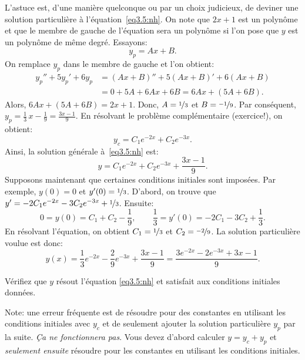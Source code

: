L'astuce est, d'une manière quelconque ou par un choix judicieux, de deviner une solution particulière à 
l'équation~\eqref{eq3.5:nh}.  
On note que $2x+1$ est un polynôme et que le membre de gauche de l'équation sera un polynôme si l'on pose que $y$ est un polynôme de même degré. Essayons: 
\begin{equation*}
	y_p = Ax + B .
\end{equation*}
On remplace $y_p$ dans le membre de gauche et l'on obtient: 
\begin{align*}
	y_p'' + 5y_p'+ 6y_p & = (Ax+B)'' + 5(Ax+B)' + 6(Ax+B) \\
						& = 0 + 5A + 6Ax + 6B = 6Ax+ (5A+6B) .
\end{align*}
Alors, $6Ax+(5A+6B) = 2x+1$.  
Donc, $A = \nicefrac{1}{3}$ et $B = \nicefrac{-1}{9}$.
Par conséquent, $y_p = \frac{1}{3}\, x - \frac{1}{9} = \frac{3x-1}{9}$.
En résolvant le problème complémentaire (exercice!), on obtient: 
\begin{equation*}
	y_c = C_1 e^{-2x} + C_2 e^{-3x}.
\end{equation*}
Ainsi, la solution générale à~\eqref{eq3.5:nh} est: 
\begin{equation*}
	y = C_1 e^{-2x} + C_2 e^{-3x} + \frac{3x-1}{9} .
\end{equation*}
Supposons maintenant que certaines conditions initiales sont imposées. 
Par exemple,  $y(0) = 0$ et $y'(0) = \nicefrac{1}{3}$.  
D'abord, on trouve que $y' = - 2C_1 e^{-2x} - 3C_2 e^{-3x} + \nicefrac{1}{3}$.
Ensuite: 
\begin{equation*}
			0   = y(0)  = C_1 + C_2 -\frac{1}{9} , \qquad
	\frac{1}{3} = y'(0) = - 2C_1 - 3C_2 + \frac{1}{3} .
\end{equation*}
En résolvant l'équation, on obtient $C_1 = \nicefrac{1}{3}$ et $C_2 = \nicefrac{-2}{9}$.
La solution particulière voulue est donc:  
\begin{equation*}
	y(x) = \frac{1}{3} e^{-2x} - \frac{2}{9} e^{-3x} + \frac{3x-1}{9} 
		 = \frac{3 e^{-2x} - 2 e^{-3x} + 3x-1}{9} .
\end{equation*}

\begin{exercise}
	Vérifiez que $y$ résout  l'équation  \eqref{eq3.5:nh}
	et satisfait aux conditions initiales données.  
\end{exercise}

Note: une erreur fréquente est de résoudre pour des constantes en utilisant les conditions initiales avec  $y_c$ et de seulement ajouter la solution particulière $y_p$ par la suite.
 \emph{Ça ne fonctionnera pas}.  Vous devez d'abord calculer $y = y_c + y_p$ et
\emph{seulement ensuite} résoudre pour les constantes en utilisant les conditions initiales. 


